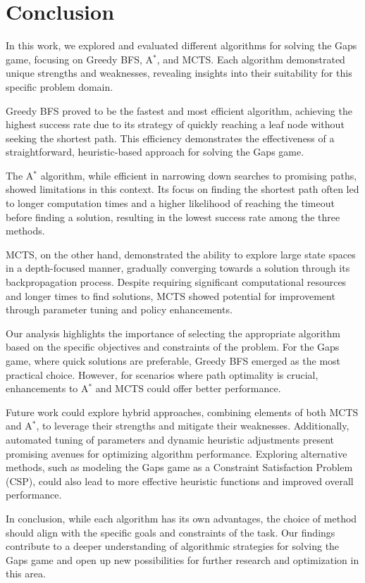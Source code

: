 \chapter{Conclusion}
In this work, we explored and evaluated different algorithms for solving the Gaps game, focusing on Greedy BFS, A$^*$, and MCTS. Each algorithm demonstrated unique strengths and weaknesses, revealing insights into their suitability for this specific problem domain.

Greedy BFS proved to be the fastest and most efficient algorithm, achieving the highest success rate due to its strategy of quickly reaching a leaf node without seeking the shortest path. This efficiency demonstrates the effectiveness of a straightforward, heuristic-based approach for solving the Gaps game.

The A$^*$ algorithm, while efficient in narrowing down searches to promising paths, showed limitations in this context. Its focus on finding the shortest path often led to longer computation times and a higher likelihood of reaching the timeout before finding a solution, resulting in the lowest success rate among the three methods.

MCTS, on the other hand, demonstrated the ability to explore large state spaces in a depth-focused manner, gradually converging towards a solution through its backpropagation process. Despite requiring significant computational resources and longer times to find solutions, MCTS showed potential for improvement through parameter tuning and policy enhancements.

Our analysis highlights the importance of selecting the appropriate algorithm based on the specific objectives and constraints of the problem. For the Gaps game, where quick solutions are preferable, Greedy BFS emerged as the most practical choice. However, for scenarios where path optimality is crucial, enhancements to A$^*$ and MCTS could offer better performance.

Future work could explore hybrid approaches, combining elements of both MCTS and A$^*$, to leverage their strengths and mitigate their weaknesses. Additionally, automated tuning of parameters and dynamic heuristic adjustments present promising avenues for optimizing algorithm performance. Exploring alternative methods, such as modeling the Gaps game as a Constraint Satisfaction Problem (CSP), could also lead to more effective heuristic functions and improved overall performance.

In conclusion, while each algorithm has its own advantages, the choice of method should align with the specific goals and constraints of the task. Our findings contribute to a deeper understanding of algorithmic strategies for solving the Gaps game and open up new possibilities for further research and optimization in this area.

